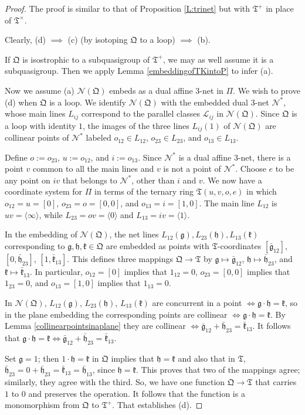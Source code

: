 \documentclass[reqno,12pt]{amsart}
\theoremstyle{remark}
\numberwithin{equation}{section}
\numberwithin{figure}{section}
\renewcommand \cL{\mathcal{L}}	%
\newcommand \cN{\mathcal{N}}
\newcommand \fQ{\mathfrak Q}
\newcommand \fT{\mathfrak T}
\newcommand \hZ{\langle\infty\rangle}
\newcommand\Qg{\mathfrak g}
\newcommand\Qh{\mathfrak h}
\newcommand\Qk{\mathfrak k}
\newcommand\Tg{\bar{\mathfrak g}}
\newcommand\Th{\bar{\mathfrak h}}
\newcommand\Tk{\bar{\mathfrak k}}
\newcommand\PP{\Pi}	%
\begin{document}
\begin{proof}
The proof is similar to that of Proposition \ref{L:trinet} but with $\fT^+$ in place of $\fT^\times$.  

Clearly, (d) $\implies$ (c) (by isotoping $\fQ$ to a loop) $\implies$ (b).  

If $\fQ$ is isostrophic to a subquasigroup of $\fT^+$, we may as well assume it is a subquasigroup.   Then we apply Lemma \ref{embeddingofTKintoP} to infer (a).

Now we assume (a) $\cN(\fQ)$ embeds as a dual affine $3$-net in $\PP$.  We wish to prove (d) when $\fQ$ is a loop.  We identify $\cN(\fQ)$ with the embedded dual $3$-net $\cN^*$, whose main lines $L_{ij}$ correspond to the parallel classes $\cL_{ij}$ in $\cN(\fQ)$.  Since $\fQ$ is a loop with identity $1$, the images of the three lines $L_{ij}(1)$ of $\cN(\fQ)$ are collinear points of $\cN^*$ labeled $o_{12}\in L_{12}$, $o_{23}\in L_{23}$, and $o_{13}\in L_{13}$.  

Define $o:=o_{23}$, $u:=o_{12}$, and $i:=o_{13}$.  
Since $\cN^*$ is a dual affine $3$-net, there is a point $v$ common to all the main lines and $v$ is not a point of $\cN^*$.  Choose $e$ to be any point on $iv$ that belongs to $\cN^*$, other than $i$ and $v$.  We now have a coordinate system for $\Pi$ in terms of the ternary ring $\fT(u,v,o,e)$ in which $o_{12}=u=[0]$, $o_{23}=o=[0,0]$, and $o_{13}=i=[1,0]$.  The main line $L_{12}$ is $uv=\hZ$, while $L_{23}=ov=\langle0\rangle$ and $L_{13}=iv=\langle1\rangle$.  

In the embedding of $\cN(\fQ)$, the net lines $L_{12}(\Qg), L_{23}(\Qh), L_{13}(\Qk)$ corresponding to $\Qg, \Qh, \Qk \in \fQ$ are embedded as points with $\fT$-coordinates $[\Tg_{12}]$, $[0,\Th_{23}]$, $[1,\Tk_{13}]$.  This defines three mappings $\fQ \to \fT$ by $\Qg \mapsto \Tg_{12}$, $\Qh \mapsto \Th_{23}$, and $\Qk \mapsto \Tk_{13}$.  
In particular, $o_{12}=[0]$ implies that $1_{12}=0$, $o_{23}=[0,0]$ implies that $1_{23}=0$, and $o_{13}=[1,0]$ implies that $1_{13}=0$.

In $\cN(\fQ)$, $L_{12}(\Qg)$, $L_{23}(\Qh)$, $L_{13}(\Qk)$ are concurrent in a point $\iff \Qg \cdot \Qh = \Qk$, so in the plane embedding the corresponding points are collinear $\iff \Qg \cdot \Qh = \Qk$.  By Lemma \ref{collinearpointsinaplane} they are collinear $\iff \Tg_{12} + \Th_{23} = \Tk_{13}$.  It follows that $\Qg \cdot \Qh = \Qk \iff \Tg_{12} + \Th_{23} = \Tk_{13}$.

Set $\Qg=1$; then $1 \cdot \Qh = \Qk$ in $\fQ$ implies that $\Qh=\Qk$ and also that in $\fT$, $\Th_{23} = 0 + \Th_{23} = \Tk_{13} = \Th_{13}$, since $\Qh=\Qk$.  
This proves that two of the mappings agree; similarly, they agree with the third.  So, we have one function $\fQ \to \fT$ that carries $1$ to $0$ and preserves the operation.  It follows that the function is a monomorphism from $\fQ$ to $\fT^+$.  That establishes (d).
\end{proof}
\end{document}
